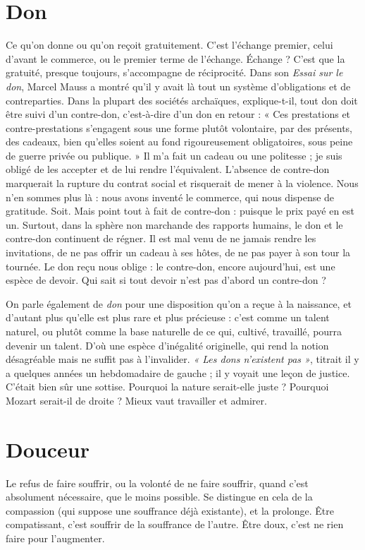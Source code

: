 \section{Don}
Ce qu’on donne ou qu’on reçoit gratuitement. C’est l’échange premier,
celui d’avant le commerce, ou le premier terme de l'échange.
Échange ? C’est que la gratuité, presque toujours, s'accompagne de réciprocité.
Dans son {\it Essai sur le don}, Marcel Mauss a montré qu’il y avait là tout un système
d’obligations et de contreparties. Dans la plupart des sociétés archaïques,
explique-t-il, tout don doit être suivi d’un contre-don, c’est-à-dire d’un don en
retour : « Ces prestations et contre-prestations s’engagent sous une forme
plutôt volontaire, par des présents, des cadeaux, bien qu’elles soient au fond
rigoureusement obligatoires, sous peine de guerre privée ou publique. » Il m’a
fait un cadeau ou une politesse ; je suis obligé de les accepter et de lui rendre
l'équivalent. L'absence de contre-don marquerait la rupture du contrat social et
risquerait de mener à la violence. Nous n’en sommes plus là : nous avons
inventé le commerce, qui nous dispense de gratitude. Soit. Mais point tout à
fait de contre-don : puisque le prix payé en est un. Surtout, dans la sphère non
marchande des rapports humains, le don et le contre-don continuent de régner.
Il est mal venu de ne jamais rendre les invitations, de ne pas offrir un cadeau à
ses hôtes, de ne pas payer à son tour la tournée. Le don reçu nous oblige : le
contre-don, encore aujourd’hui, est une espèce de devoir. Qui sait si tout
devoir n’est pas d’abord un contre-don ?

On parle également de {\it don} pour une disposition qu’on a reçue à la naissance,
et d'autant plus qu’elle est plus rare et plus précieuse : c’est comme un
talent naturel, ou plutôt comme la base naturelle de ce qui, cultivé, travaillé,
pourra devenir un talent. D'où une espèce d’inégalité originelle, qui rend la
notion désagréable mais ne suffit pas à l’invalider. {\it « Les dons n'existent pas »},
titrait il y a quelques années un hebdomadaire de gauche ; il y voyait une leçon
de justice. C'était bien sûr une sottise. Pourquoi la nature serait-elle juste ?
Pourquoi Mozart serait-il de droite ? Mieux vaut travailler et admirer.

\section{Douceur}
Le refus de faire souffrir, ou la volonté de ne faire souffrir, quand
c’est absolument nécessaire, que le moins possible. Se distingue
en cela de la compassion (qui suppose une souffrance déjà existante), et la prolonge.
Être compatissant, c’est souffrir de la souffrance de l’autre. Être doux,
c’est ne rien faire pour l’augmenter.


